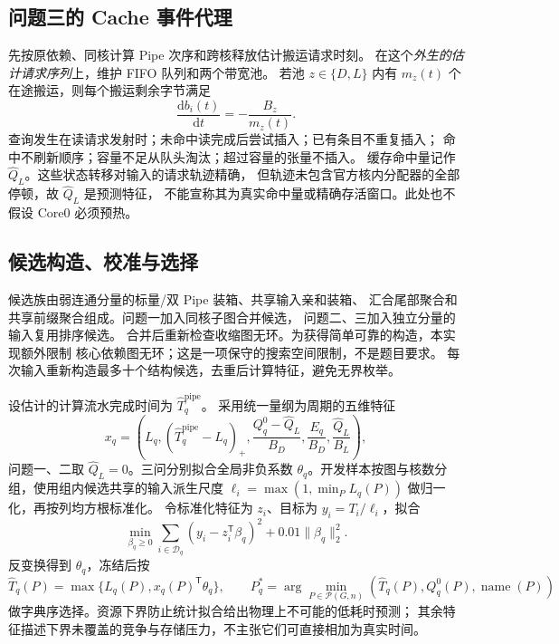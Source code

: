 \subsection{问题三的 Cache 事件代理}
先按原依赖、同核计算 Pipe 次序和跨核释放估计搬运请求时刻。
在这个\emph{外生的估计请求序列}上，维护 FIFO 队列和两个带宽池。
若池 $z\in\{D,L\}$ 内有 $m_z(t)$ 个在途搬运，则每个搬运剩余字节满足
\begin{equation}
 \frac{\mathrm d b_i(t)}{\mathrm dt}=-\frac{B_z}{m_z(t)}.
 \label{eq:fresh-pool}
\end{equation}
查询发生在读请求发射时；未命中读完成后尝试插入；已有条目不重复插入；
命中不刷新顺序；容量不足从队头淘汰；超过容量的张量不插入。
缓存命中量记作 $\widehat Q_L$。这些状态转移对输入的请求轨迹精确，
但轨迹未包含官方核内分配器的全部停顿，故 $\widehat Q_L$ 是预测特征，
不能宣称其为真实命中量或精确存活窗口。此处也不假设 Core0 必须预热。

\subsection{候选构造、校准与选择}
候选族由弱连通分量的标量/双 Pipe 装箱、共享输入亲和装箱、
汇合尾部聚合和共享前缀聚合组成。问题一加入同核子图合并候选，
问题二、三加入独立分量的输入复用排序候选。
合并后重新检查收缩图无环。为获得简单可靠的构造，本实现额外限制
核心依赖图无环；这是一项保守的搜索空间限制，不是题目要求。
每次输入重新构造最多十个结构候选，去重后计算特征，避免无界枚举。

设估计的计算流水完成时间为 $\widehat T_q^{\mathrm{pipe}}$。
采用统一量纲为周期的五维特征
\begin{equation}
 x_q=\left(L_q,(\widehat T_q^{\mathrm{pipe}}-L_q)_+,
 \frac{Q_q^0-\widehat Q_L}{B_D},\frac{E_q}{B_D},
 \frac{\widehat Q_L}{B_L}\right),
 \label{eq:fresh-features}
\end{equation}
问题一、二取 $\widehat Q_L=0$。三问分别拟合全局非负系数
$\theta_q$。开发样本按图与核数分组，使用组内候选共享的输入派生尺度
$\ell_i=\max(1,\min_{P} L_q(P))$ 做归一化，再按列均方根标准化。
令标准化特征为 $z_i$、目标为 $y_i=T_i/\ell_i$，拟合
\begin{equation}
 \min_{\beta_q\ge0}\sum_{i\in\mathcal D_q}(y_i-z_i^\mathsf T\beta_q)^2
             +0.01\|\beta_q\|_2^2.
\end{equation}
反变换得到 $\theta_q$，冻结后按
\begin{equation}
 \widehat T_q(P)=\max\{L_q(P),x_q(P)^\mathsf T\theta_q\},\qquad
 P_q^*=\arg\min_{P\in\mathcal P(G,n)}
       (\widehat T_q(P),Q_q^0(P),\operatorname{name}(P))
 \label{eq:fresh-selection}
\end{equation}
做字典序选择。资源下界防止统计拟合给出物理上不可能的低耗时预测；
其余特征描述下界未覆盖的竞争与存储压力，不主张它们可直接相加为真实时间。

